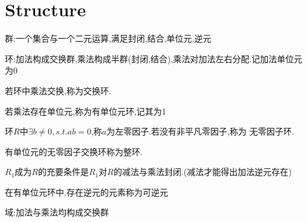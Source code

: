 \section{Structure}
群:一个集合与一个二元运算,满足封闭,结合,单位元,逆元

环:加法构成交换群,乘法构成半群(封闭,结合),乘法对加法左右分配.记加法单位元为0

若环中乘法交换,称为交换环.

若乘法存在单位元,称为有单位元环,记其为1

环$ R$中$\exists b\ne 0,s.t.ab=0$,称$ a$为左零因子.若没有非平凡零因子,称为
无零因子环.

有单位元的无零因子交换环称为整环.

$ R_1$成为$ R$的充要条件是$ R_1$对$ R$的减法与乘法封闭.(减法才能得出加法逆元存在)

在有单位元环中,存在逆元的元素称为可逆元

域:加法与乘法均构成交换群
\\

